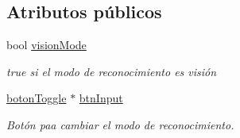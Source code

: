 \subsection*{Atributos públicos}
\begin{DoxyCompactItemize}
\item 
bool \hyperlink{classmenu_principal_a4fe6b875a2b261f24768a479b725c855}{vision\+Mode}
\begin{DoxyCompactList}\small\item\em true si el modo de reconocimiento es visión \end{DoxyCompactList}\item 
\hyperlink{classboton_toggle}{boton\+Toggle} $\ast$ \hyperlink{classmenu_principal_aea487ca8d9e0d1df2fda6a563ca0f04c}{btn\+Input}
\begin{DoxyCompactList}\small\item\em Botón paa cambiar el modo de reconocimiento. \end{DoxyCompactList}\end{DoxyCompactItemize}
